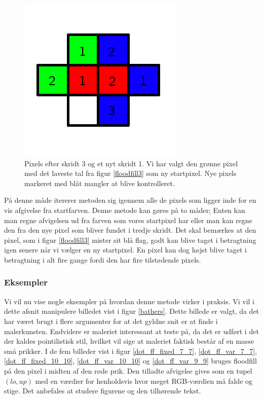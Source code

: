 {\begin{figure}[!h]
    \begin{center}
        \includegraphics[scale=0.42,angle=0]{afsnit/vores_implementation/billeder/flood_fill/floodfill4}
    \end{center}
    \caption[]{Pixels efter skridt 3 og et nyt skridt 1. Vi har valgt
    den grønne pixel med det laveste tal fra figur \ref{floodfill3} som
    ny startpixel. Nye pixels markeret med blåt mangler at blive
    kontrolleret.}
    \label{floodfill4}
\end{figure}

På denne måde itererer metoden sig igennem alle de pixels som ligger
inde for en vis afgivelse fra startfarven. Denne metode kan gøres på to
måder; Enten kan man regne afvigelsen ud fra farven som vores startpixel
har eller man kan regne den fra den nye pixel som bliver fundet i tredje
skridt. Det skal bemærkes at den pixel, som i figur \ref{floodfill3}
mister sit blå flag, godt kan blive taget i betragtning igen senere når
vi vælger en ny startpixel. En pixel kan dog højst blive taget i
betragtning i alt fire gange fordi den har fire tilstødende pixels.

\subsubsection{Eksempler}
Vi vil nu vise nogle eksempler på hvordan denne metode virker i praksis.
Vi vil i dette afsnit manipulere billedet vist i figur \ref{bathers}.
Dette billede er valgt, da det har været brugt i flere argumenter for at
det gyldne snit er at finde i
malerkunsten\cite{GoldenNumber}\cite{RatioArt}.  Endvidere er maleriet
interessant at teste på, da det er udført i det der kaldes pointilistisk
stil, hvilket vil sige at maleriet faktisk består af en masse små
prikker. I de fem billeder vist i figur \ref{dot_ff_fixed_7_7},
\ref{dot_ff_var_7_7}, \ref{dot_ff_fixed_10_10}, \ref{dot_ff_var_10_10}
og \ref{dot_ff_var_9_9} bruges floodfill på den pixel i midten af den
røde prik. Den tilladte afvigelse gives som en tupel $(lo, up)$ med en
værdier for henholdsvis hvor meget RGB-værdien må falde og stige. Det
anbefales at studere figurene og den tilhørende tekst.

}
